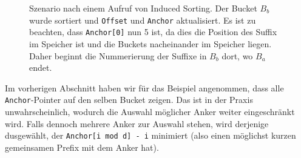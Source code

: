 \begin{figure}[!t]
\centering
{}
\caption{Szenario nach einem Aufruf von Induced Sorting. Der Bucket $B_b$ wurde sortiert und \texttt{Offset} und \texttt{Anchor} aktualisiert. Es ist zu beachten, dass \texttt{Anchor[0]} nun 5 ist, da dies die Position des Suffix im Speicher ist und die Buckets nacheinander im Speicher liegen. Daher beginnt die Nummerierung der Suffixe in $B_b$ dort, wo $B_a$ endet.}
\label{fg:beispiel2}
\end{figure}

Im vorherigen Abschnitt haben wir für das Beispiel angenommen, dass alle \texttt{Anchor}-Pointer auf den selben Bucket zeigen.
Das ist in der Praxis unwahrscheinlich, wodurch die Auswahl möglicher Anker weiter eingeschränkt wird.
Falls dennoch mehrere Anker zur Auswahl stehen, wird derjenige dusgewählt, der \texttt{Anchor[i mod d] - i} minimiert (also einen möglichst kurzen gemeinsamen Prefix mit dem Anker hat).

